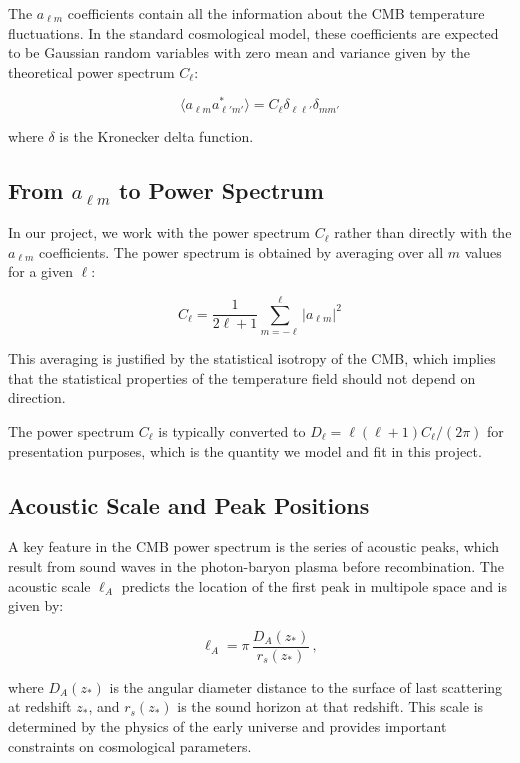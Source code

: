 \documentclass[11pt]{article}
\begin{document}
The $a_{\ell m}$ coefficients contain all the information about the CMB temperature fluctuations. In the standard cosmological model, these coefficients are expected to be Gaussian random variables with zero mean and variance given by the theoretical power spectrum $C_\ell$:

\begin{equation}
\langle a_{\ell m} a_{\ell' m'}^* \rangle = C_\ell \delta_{\ell \ell'} \delta_{m m'}
\end{equation}

where $\delta$ is the Kronecker delta function.

\subsection{From $a_{\ell m}$ to Power Spectrum}

In our project, we work with the power spectrum $C_\ell$ rather than directly with the $a_{\ell m}$ coefficients. The power spectrum is obtained by averaging over all $m$ values for a given $\ell$:

\begin{equation}
C_\ell = \frac{1}{2\ell + 1} \sum_{m=-\ell}^{\ell} |a_{\ell m}|^2
\end{equation}

This averaging is justified by the statistical isotropy of the CMB, which implies that the statistical properties of the temperature field should not depend on direction.

The power spectrum $C_\ell$ is typically converted to $D_\ell = \ell(\ell+1)C_\ell/(2\pi)$ for presentation purposes, which is the quantity we model and fit in this project.

\subsection{Acoustic Scale and Peak Positions}

A key feature in the CMB power spectrum is the series of acoustic peaks, which result from sound waves in the photon-baryon plasma before recombination. The acoustic scale $\ell_A$ predicts the location of the first peak in multipole space and is given by:

\begin{equation}
  \ell_A = \pi\,\frac{D_A(z_*)}{r_s(z_*)}\,,
\end{equation}

where $D_A(z_*)$ is the angular diameter distance to the surface of last scattering at redshift $z_*$, and $r_s(z_*)$ is the sound horizon at that redshift. This scale is determined by the physics of the early universe and provides important constraints on cosmological parameters.
\end{document}
